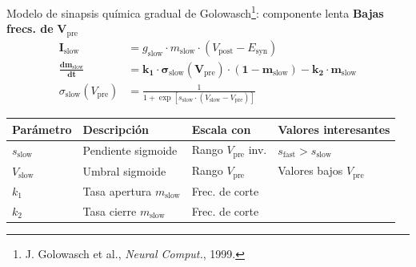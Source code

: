 \documentclass[10pt, aspectratio=169]{beamer}
\begin{document}
\begin{frame}{Modelo de sinapsis química gradual de Golowasch\footnote{J. Golowasch et al., \textit{Neural Comput.}, 1999.}: componente lenta}
    \textbf{Bajas frecs. de} $\boldsymbol{V_{\mathrm{pre}}}$ \\[0.8em]
    \small
    \begin{equation*}
        \boxed{\begin{aligned}
                \boldsymbol{I_{\mathrm{slow}}}              & = g_{\mathrm{slow}} \cdot m_{\mathrm{slow}} \cdot (V_{\mathrm{post}} - E_{\mathrm{syn}})                                      \\
                \boldsymbol{\frac{d m_{\mathrm{slow}}}{dt}} & \boldsymbol{= k_1 \cdot \sigma_{\mathrm{slow}}(V_{\mathrm{pre}}) \cdot (1 - m_{\mathrm{slow}}) - k_2 \cdot m_{\mathrm{slow}}} \\
                \sigma_{\mathrm{slow}}(V_{\mathrm{pre}})    & = \frac{1}{1 + \exp[ s_{\mathrm{slow}} \cdot (V_{\mathrm{slow}} - V_{\mathrm{pre}}) ]}
            \end{aligned}}
    \end{equation*}

    \begin{center}
        \setlength{\tabcolsep}{2pt}
        \begin{tabular}{|l|l|l|l|}
            \hline
            \textbf{Parámetro}  & \textbf{Descripción}              & \textbf{Escala con}           & \textbf{Valores interesantes}           \\
            \hline
            \rowcolor{azulclaro}
            $s_{\mathrm{slow}}$ & Pendiente sigmoide                & Rango $V_{\mathrm{pre}}$ inv. & $s_{\mathrm{fast}} > s_{\mathrm{slow}}$ \\
            \hline
            $V_{\mathrm{slow}}$ & Umbral sigmoide                   & Rango $V_{\mathrm{pre}}$      & Valores bajos $V_{\mathrm{pre}}$        \\
            \hline
            \rowcolor{azulclaro}
            $k_1$               & Tasa apertura $m_{\mathrm{slow}}$ & Frec. de corte                &                                         \\
            \hline
            $k_2$               & Tasa cierre $m_{\mathrm{slow}}$   & Frec. de corte                &                                         \\
            \hline
        \end{tabular}
    \end{center}
\end{frame}
\end{document}
